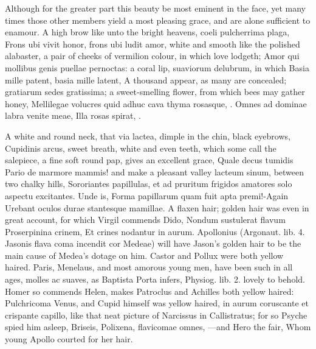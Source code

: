Although for the greater part this beauty be most eminent in the face,
yet many times those other members yield a most pleasing grace, and are
alone sufficient to enamour. A high brow like unto the bright heavens,
coeli pulcherrima plaga, Frons ubi vivit honor, frons ubi ludit amor,
white and smooth like the polished alabaster, a pair of cheeks of
vermilion colour, in which love lodgeth; Amor qui mollibus genis
puellae pernoctas: a coral lip, suaviorum delubrum, in which Basia
mille patent, basia mille latent, A thousand appear, as many are
concealed; gratiarum sedes gratissima; a sweet-smelling flower, from
which bees may gather honey, Mellilegae volucres quid adhuc cava
thyma rosasque, \etc{}.
Omnes ad dominae labra venite meae,
Illa rosas spirat, \etc{}.

A white and round neck, that via lactea, dimple in the chin, black
eyebrows, Cupidinis arcus, sweet breath, white and even teeth, which
some call the salepiece, a fine soft round pap, gives an excellent
grace, Quale decus tumidis Pario de marmore mammis! and
make a pleasant valley lacteum sinum, between two chalky hills,
Sororiantes papillulas, et ad pruritum frigidos amatores solo aspectu
excitantes. Unde is, Forma papillarum quam fuit apta premi!-Again
Urebant oculos durae stantesque mamillae. A flaxen hair; golden hair
was even in great account, for which Virgil commends Dido, Nondum
sustulerat flavum Proserpinina crinem, Et crines nodantur in aurum.
Apollonius (Argonaut. lib. 4. Jasonis flava coma incendit cor Medeae)
will have Jason's golden hair to be the main cause of Medea's dotage on
him. Castor and Pollux were both yellow haired. Paris, Menelaus, and
most amorous young men, have been such in all ages, molles ac suaves,
as Baptista Porta infers,  Physiog. lib. 2. lovely to behold.
Homer so commends Helen, makes Patroclus and Achilles both yellow
haired: Pulchricoma Venus, and Cupid himself was yellow haired, in
aurum coruscante et crispante capillo, like that neat picture of
Narcissus in Callistratus; for so Psyche spied him asleep,
Briseis, Polixena, \etc{} flavicomae omnes,
---and Hero the fair,
Whom young Apollo courted for her hair.

